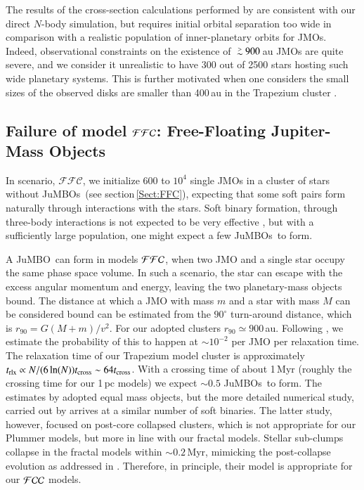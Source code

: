 \documentclass[submission,phys]{lib/SciPost}
\def\apgt{\ {\raise-.5ex\hbox{$\buildrel>\over\sim$}}\ }
\newcommand{\jumbo}{\mbox{JuMBO}}
\newcommand{\jumbos}{\mbox{JuMBOs}}
\begin{document}
The results of the cross-section calculations performed by
\cite{2023arXiv231006016W} are consistent with our direct $N$-body
simulation, but requires initial orbital separation too wide in
comparison with a realistic population of inner-planetary orbits for
JMOs. Indeed, observational constraints on the existence of $\apgt
900$\,au JMOs are quite severe, and we consider it unrealistic to have
300 out of 2500 stars hosting such wide planetary systems. This is
further motivated when one considers the small sizes of the observed
disks are smaller than 400\,au in the Trapezium cluster
\cite{2005A&A...441..195V}.


\subsection{Failure of model ${\cal FFC}$: Free-Floating Jupiter-Mass Objects}\label{sect:FFC_model_results}

In scenario, $\mathcal{FFC}$, we initialize $600$ to $10^4$ single
JMOs in a cluster of stars without \jumbos\, (see
section\,\ref{Sect:FFC}), expecting that some soft pairs form
naturally through interactions with the stars. Soft binary formation,
through three-body interactions is not expected to be very effective
\cite{1976A&A....53..259A}, but with a sufficiently large population,
one might expect a few \jumbos\, to form.

A \jumbo\, can form in models ${\cal FFC}$, when two JMO and a single
star occupy the same phase space volume. In such a scenario, the
star can escape with the excess angular momentum and energy, leaving
the two planetary-mass objects bound.  The distance at which a JMO with
mass $m$ and a star with mass $M$ can be considered bound can be
estimated from the $90^\circ$ turn-around distance, which is $r_{90} =
G(M+m)/v^2$.  For our adopted clusters $r_{90} \simeq
900$\,au. Following \cite{1976A&A....53..259A}, we estimate the
probability of this to happen at $\sim 10^{-2}$ per JMO per
relaxation time. The relaxation time of our Trapezium model cluster is
approximately $t_{\rm rlx} \propto N/(6\ln(N)) t_{\rm cross} \sim
64t_{\rm cross}$. With a crossing time of about 1\,Myr (roughly the
crossing time for our 1\,pc models) we expect $\sim 0.5$ \jumbos\, to
form. The estimates by \cite{1976A&A....53..259A} adopted equal mass
objects, but the more detailed numerical study, carried out by
\cite{2011MNRAS.415.1179M} arrives at a similar number of soft
binaries. The latter study, however, focused on post-core collapsed
clusters, which is not appropriate for our Plummer models, but more in
line with our fractal models. Stellar sub-clumps collapse in the
fractal models within $\sim 0.2$\,Myr, mimicking the post-collapse
evolution as addressed in \cite{2011MNRAS.415.1179M}. Therefore, in principle,
their model is appropriate for our ${\cal FCC}$ models.
\end{document}
